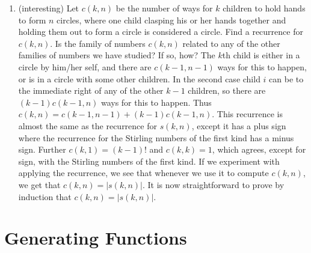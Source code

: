 \documentclass[10pt,]{book}
\theoremstyle{plain}
\theoremstyle{definition}
\numberwithin{equation}{chapter}
\begin{document}
\begin{enumerate}
%
\item\hypertarget{li-73}{}(interesting) Let \(c(k,n)\) be the number of ways for \(k\) children to hold hands to form \(n\) circles, where one child clasping his or her hands together and holding them out to form a circle is considered a circle.  Find a recurrence for \(c(k,n)\).  Is the family of numbers \(c(k,n)\) related to any of the other families of numbers we have studied? If so, how? The \(k\)th child is either in a circle by him/her self, and there are \(c(k-1,n-1)\) ways for this to happen, or is in a circle with some other children. In the second case child \(i\) can be to the immediate right of any of the other \(k-1\) children, so there are \((k-1)c(k-1,n)\) ways for this to happen. Thus \(c(k,n)=c(k-1,n-1)
+(k-1)c(k-1,n)\). This recurrence is almost the same as the recurrence for \(s(k,n)\), except it has a plus sign where the recurrence for the Stirling numbers of the first kind has a minus sign. Further \(c(k,1)=(k-1)!\) and \(c(k,k)=1\), which agrees, except for sign, with the Stirling numbers of the first kind. If we experiment with applying the recurrence, we see that whenever we use it to compute \(c(k,n)\), we get that \(c(k,n)=|s(k,n)|\). It is now straightforward to prove by induction that \(c(k,n)=|s(k,n)|\).%
%
\end{enumerate}
\typeout{************************************************}
\typeout{************************************************}
\chapter[{Generating Functions}]{Generating Functions}\label{ch_genfns}
\typeout{************************************************}
\typeout{************************************************}
\end{document}
